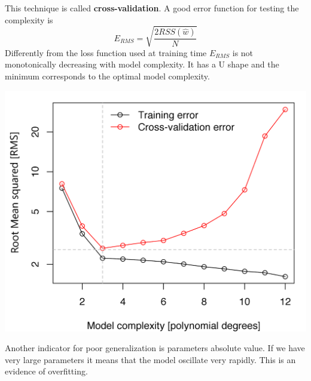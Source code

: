 \documentclass[main.tex]{subfiles}
\begin{document}
This technique is called \textbf{cross-validation}.
A good error function for testing the complexity is
\begin{equation}
    E_{RMS}=\sqrt{\frac{2RSS(\hat{w})}{N}}
\end{equation}
Differently from the loss function used at training time $E_{RMS}$ is not monotonically decreasing with model complexity. It has a U shape and the minimum corresponds to the optimal model complexity.

\begin{center}
    \includegraphics[scale=0.25]{img/error_complexity.png}
\end{center}

Another indicator for poor generalization is parameters absolute value. If we have very large parameters it means that the model oscillate very rapidly. This is an evidence of overfitting.
\end{document}
